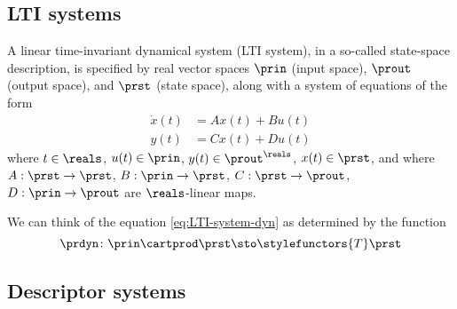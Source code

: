 \subsection{LTI systems}

A linear time-invariant dynamical system (LTI system), in a so-called state-space description, is specified by real vector spaces $\prin$ (input space), $\prout$ (output space), and $\prst$ (state space), along with a system of equations of the form
\begin{align}
        \dot x(t) &= Ax(t) + Bu(t) \label{eq:LTI-system-dyn} \\
        y(t) &= Cx(t) + Du(t) \label{eq:LTI-system-ro}
\end{align}
where $t \in \reals$, $u(t) \in \prin$, $y(t) \in \prout^\reals$, $x(t) \in \prst$, and where $A: \prst \to \prst$, $B: \prin \to \prst$, $C: \prst \to \prout$, $D: \prin \to \prout$ are $\reals$-linear maps. 

We can think of the equation \cref{eq:LTI-system-dyn} as determined by the function 
\begin{equation}
\prdyn \colon \prin \cartprod \prst \sto \stylefunctors{T} \prst
\end{equation}



\subsection{Descriptor systems}

